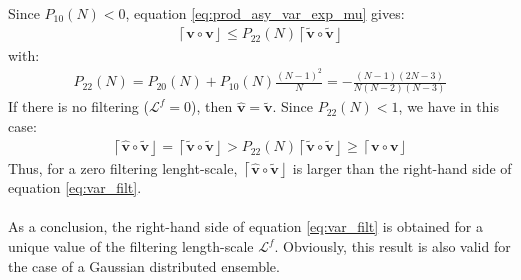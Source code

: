 \documentclass[12pt]{scrartcl}
\begin{document}
Since $P_{10}(N) < 0$, equation \eqref{eq:prod_asy_var_exp_mu} gives:
\begin{align}
\left\lceil \mathbf{v} \circ \mathbf{v} \right\rfloor \le P_{22}(N) \left\lceil\widetilde{\mathbf{v}} \circ \widetilde{\mathbf{v}}\right\rfloor
\end{align}
with:
\begin{align}
P_{22}(N) = P_{20}(N) + P_{10}(N) \frac{(N-1)^2}{N} = -\frac{(N-1)(2N-3)}{N(N-2)(N-3)}
\end{align}
If there is no filtering ($\mathcal{L}^f=0$), then $\widehat{\mathbf{v}} = \widetilde{\mathbf{v}}$. Since $P_{22}(N) < 1$, we have in this case:
\begin{align}
\left\lceil\widehat{\mathbf{v}} \circ \widetilde{\mathbf{v}}\right\rfloor = \left\lceil\widetilde{\mathbf{v}} \circ \widetilde{\mathbf{v}}\right\rfloor > P_{22}(N) \left\lceil\widetilde{\mathbf{v}} \circ \widetilde{\mathbf{v}}\right\rfloor \ge \left\lceil \mathbf{v} \circ \mathbf{v} \right\rfloor
\end{align}
Thus, for a zero filtering lenght-scale, $\left\lceil\widehat{\mathbf{v}} \circ \widetilde{\mathbf{v}}\right\rfloor$ is larger than the right-hand side of equation \eqref{eq:var_filt}.\\
$  $\\
As a conclusion, the right-hand side of equation \eqref{eq:var_filt} is obtained for a unique value of the filtering length-scale $\mathcal{L}^f$. Obviously, this result is also valid for the case of a Gaussian distributed ensemble.
\end{document}
